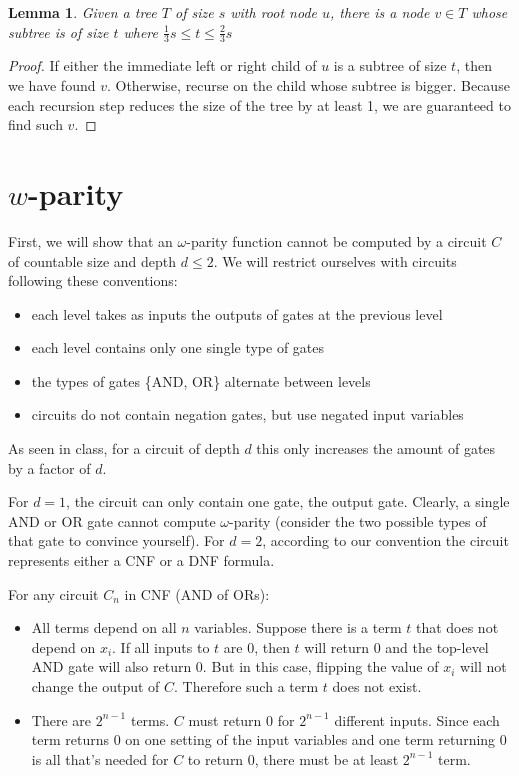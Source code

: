 \documentclass{article}
\newtheorem{lemma}{Lemma}
\begin{document}
\begin{lemma}\label{lemma:subtree}
Given a tree $T$ of size $s$ with root node $u$, there is a node $v \in T$ whose subtree is of size $t$ where $\frac{1}{3}s\leq t \leq \frac{2}{3}s$
\end{lemma}
\begin{proof}
If either the immediate left or right child of $u$ is a subtree of size $t$, then we have found $v$. Otherwise, recurse on the child whose subtree is bigger. Because each recursion step reduces the size of the tree by at least 1, we are guaranteed to find such $v$.
\end{proof}

\newpage
\section{$w$-parity}

First, we will show that an $\omega$-parity function cannot be computed by a circuit $C$ of countable size and depth $d \leq 2$. We will restrict ourselves with circuits following these conventions:
\begin{itemize}
\item each level takes as inputs the outputs of gates at the previous level
\item each level contains only one single type of gates
\item the types of gates \{AND, OR\} alternate between levels
\item circuits do not contain negation gates, but use negated input variables
\end{itemize}
As seen in class, for a circuit of depth $d$ this only increases the amount of gates by a factor of $d$.

For $d=1$, the circuit can only contain one gate, the output gate. Clearly, a single AND or OR gate cannot compute $\omega$-parity (consider the two possible types of that gate to convince yourself). For $d=2$, according to our convention the circuit represents either a CNF or a DNF formula.

For any circuit $C_n$ in CNF (AND of ORs):
\begin{itemize}
\item All terms depend on all $n$ variables. Suppose there is a term $t$ that does not depend on $x_i$. If all inputs to $t$ are 0, then $t$ will return 0 and the top-level AND gate will also return 0. But in this case, flipping the value of $x_i$ will not change the output of $C$. Therefore such a term $t$ does not exist.
\item There are $2^{n-1}$ terms. $C$ must return 0 for $2^{n-1}$ different inputs. Since each term returns 0 on one setting of the input variables and one term returning 0 is all that's needed for $C$ to return 0, there must be at least $2^{n-1}$ term.
\end{itemize}
\end{document}
